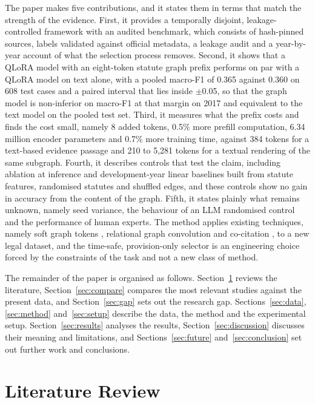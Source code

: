 \documentclass[journal]{IEEEtran}
\begin{document}
The paper makes five contributions, and it states them in terms that match the strength of the evidence. First, it provides a temporally disjoint, leakage-controlled framework with an audited benchmark, which consists of hash-pinned sources, labels validated against official metadata, a leakage audit and a year-by-year account of what the selection process removes. Second, it shows that a QLoRA model with an eight-token statute graph prefix performs on par with a QLoRA model on text alone, with a pooled macro-F1 of 0.365 against 0.360 on 608 test cases and a paired interval that lies inside $\pm$0.05, so that the graph model is non-inferior on macro-F1 at that margin on 2017 and equivalent to the text model on the pooled test set. Third, it measures what the prefix costs and finds the cost small, namely 8 added tokens, 0.5\% more prefill computation, 6.34 million encoder parameters and 0.7\% more training time, against 384 tokens for a text-based evidence passage and 210 to 5,281 tokens for a textual rendering of the same subgraph. Fourth, it describes controls that test the claim, including ablation at inference and development-year linear baselines built from statute features, randomised statutes and shuffled edges, and these controls show no gain in accuracy from the content of the graph. Fifth, it states plainly what remains unknown, namely seed variance, the behaviour of an LLM randomised control and the performance of human experts. The method applies existing techniques, namely soft graph tokens \cite{r21}, relational graph convolution \cite{r32} and co-citation \cite{r31}, to a new legal dataset, and the time-safe, provision-only selector is an engineering choice forced by the constraints of the task and not a new class of method.

The remainder of the paper is organised as follows. Section~\ref{sec:related} reviews the literature, Section~\ref{sec:compare} compares the most relevant studies against the present data, and Section~\ref{sec:gap} sets out the research gap. Sections~\ref{sec:data}, \ref{sec:method} and~\ref{sec:setup} describe the data, the method and the experimental setup. Section~\ref{sec:results} analyses the results, Section~\ref{sec:discussion} discusses their meaning and limitations, and Sections~\ref{sec:future} and~\ref{sec:conclusion} set out further work and conclusions.

\section{Literature Review}\label{sec:related}
\end{document}
